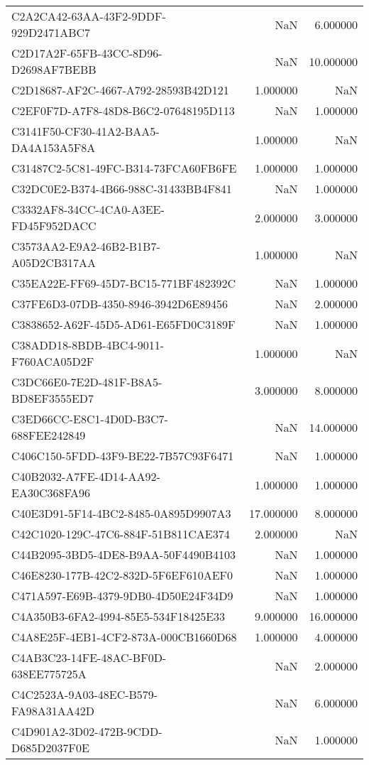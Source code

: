 \begin{tabular}{lrr}
C2A2CA42-63AA-43F2-9DDF-929D2471ABC7 & NaN & 6.000000 \\
C2D17A2F-65FB-43CC-8D96-D2698AF7BEBB & NaN & 10.000000 \\
C2D18687-AF2C-4667-A792-28593B42D121 & 1.000000 & NaN \\
C2EF0F7D-A7F8-48D8-B6C2-07648195D113 & NaN & 1.000000 \\
C3141F50-CF30-41A2-BAA5-DA4A153A5F8A & 1.000000 & NaN \\
C31487C2-5C81-49FC-B314-73FCA60FB6FE & 1.000000 & 1.000000 \\
C32DC0E2-B374-4B66-988C-31433BB4F841 & NaN & 1.000000 \\
C3332AF8-34CC-4CA0-A3EE-FD45F952DACC & 2.000000 & 3.000000 \\
C3573AA2-E9A2-46B2-B1B7-A05D2CB317AA & 1.000000 & NaN \\
C35EA22E-FF69-45D7-BC15-771BF482392C & NaN & 1.000000 \\
C37FE6D3-07DB-4350-8946-3942D6E89456 & NaN & 2.000000 \\
C3838652-A62F-45D5-AD61-E65FD0C3189F & NaN & 1.000000 \\
C38ADD18-8BDB-4BC4-9011-F760ACA05D2F & 1.000000 & NaN \\
C3DC66E0-7E2D-481F-B8A5-BD8EF3555ED7 & 3.000000 & 8.000000 \\
C3ED66CC-E8C1-4D0D-B3C7-688FEE242849 & NaN & 14.000000 \\
C406C150-5FDD-43F9-BE22-7B57C93F6471 & NaN & 1.000000 \\
C40B2032-A7FE-4D14-AA92-EA30C368FA96 & 1.000000 & 1.000000 \\
C40E3D91-5F14-4BC2-8485-0A895D9907A3 & 17.000000 & 8.000000 \\
C42C1020-129C-47C6-884F-51B811CAE374 & 2.000000 & NaN \\
C44B2095-3BD5-4DE8-B9AA-50F4490B4103 & NaN & 1.000000 \\
C46E8230-177B-42C2-832D-5F6EF610AEF0 & NaN & 1.000000 \\
C471A597-E69B-4379-9DB0-4D50E24F34D9 & NaN & 1.000000 \\
C4A350B3-6FA2-4994-85E5-534F18425E33 & 9.000000 & 16.000000 \\
C4A8E25F-4EB1-4CF2-873A-000CB1660D68 & 1.000000 & 4.000000 \\
C4AB3C23-14FE-48AC-BF0D-638EE775725A & NaN & 2.000000 \\
C4C2523A-9A03-48EC-B579-FA98A31AA42D & NaN & 6.000000 \\
C4D901A2-3D02-472B-9CDD-D685D2037F0E & NaN & 1.000000 \\

\end{tabular}

